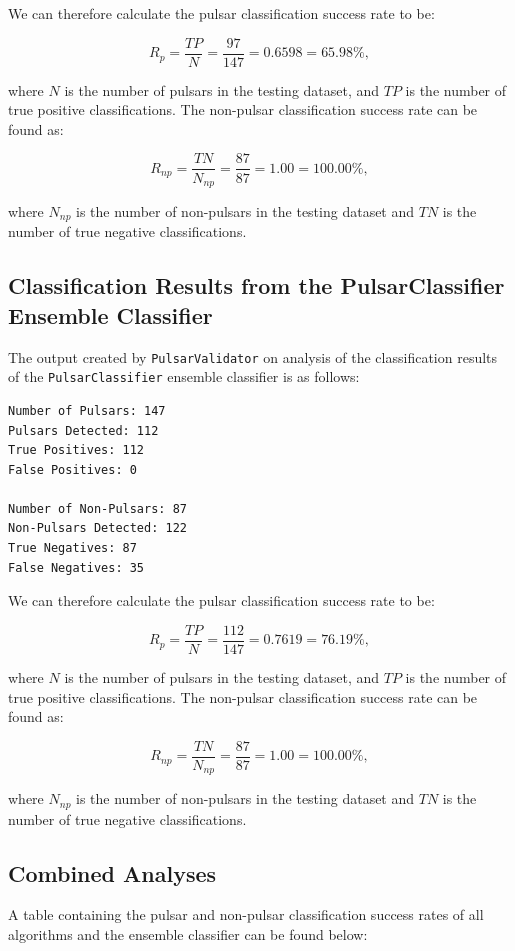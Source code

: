 \documentclass{article}
\begin{document}
We can therefore calculate the pulsar classification success rate to be:

$$ R_{p} = \frac{TP}{N} = \frac{97}{147} =  0.6598 = 65.98\%,$$

where $N$ is the number of pulsars in the testing dataset, and $TP$ is the number of true positive classifications. The non-pulsar classification success rate can be found as:

$$R_{np} = \frac{TN}{N_{np}} = \frac{87}{87} = 1.00 = 100.00\%,$$

where $N_{np}$ is the number of non-pulsars in the testing dataset and $TN$ is the number of true negative classifications.

\subsection{Classification Results from the PulsarClassifier Ensemble Classifier}

The output created by \verb|PulsarValidator| on analysis of the classification results of the \verb|PulsarClassifier| ensemble classifier is as follows:

\begin{lstlisting}[numbers=none]
Number of Pulsars: 147
Pulsars Detected: 112
True Positives: 112
False Positives: 0

Number of Non-Pulsars: 87
Non-Pulsars Detected: 122
True Negatives: 87
False Negatives: 35
\end{lstlisting}

We can therefore calculate the pulsar classification success rate to be:

$$ R_{p} = \frac{TP}{N} = \frac{112}{147} =  0.7619 = 76.19\%,$$

where $N$ is the number of pulsars in the testing dataset, and $TP$ is the number of true positive classifications. The non-pulsar classification success rate can be found as:

$$R_{np} = \frac{TN}{N_{np}} = \frac{87}{87} = 1.00 = 100.00\%,$$

where $N_{np}$ is the number of non-pulsars in the testing dataset and $TN$ is the number of true negative classifications.

\subsection{Combined Analyses}

A table containing the pulsar and non-pulsar classification success rates of all algorithms and the ensemble classifier can be found below:
\end{document}
